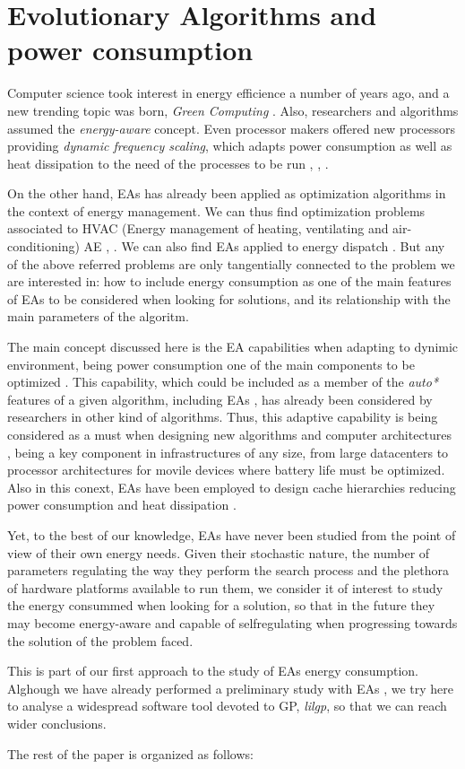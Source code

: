 \section{Evolutionary Algorithms and power consumption}

Computer science took interest in energy efficience a number of years ago, and a new trending topic was born, \textit{Green Computing} \cite{green-computing}.  Also, researchers and algorithms assumed the \textit{energy-aware} \cite{energy-aware} concept.  Even processor makers offered new processors providing \textit{dynamic frequency scaling}, which adapts power consumption as well as heat dissipation to the need of the processes to be run \cite{scaling}, \cite{dynamic-scaling}, \cite{energy-efficient}.

On the other hand, EAs has already been applied as optimization algorithms in the context of energy management.  We can thus find optimization problems associated to HVAC (Energy management of heating, ventilating and air-conditioning) AE \cite{HVAC}, \cite{chiller}.  We can also find EAs applied to energy dispatch \cite{dispatch}.  But any of the above referred problems are only tangentially connected to the problem we are interested in:  how to include energy consumption as one of the main features of EAs to be considered when looking for solutions, and its relationship with the main parameters of the algoritm.

The main concept discussed here is the EA capabilities when adapting to dynimic environment, being power consumption one of the main components to be optimized \cite{ephemeral}. This capability, which could be included as a member of the \textit{auto*} features of a given algorithm, including EAs \cite{self}, has already been considered by researchers in other kind of algorithms.  Thus, this adaptive capability is being considered as a must when designing new algorithms and computer architectures \cite{energy-aware}, being a key component in infrastructures of any size, from large datacenters to processor architectures for movile devices where battery life must be optimized.  Also in this conext, EAs have been employed to design cache hierarchies reducing power consumption and heat dissipation \cite{cache}.

Yet, to the best of our knowledge, EAs have never been studied from the point of view of their own energy needs.  Given their stochastic nature, the number of parameters regulating the way they perform the search process and the plethora of hardware platforms available to run them, we consider it of interest to study the energy consummed when looking for a solution, so that in the future they may become energy-aware and capable of selfregulating when progressing towards the solution of the problem faced.

This is part of our first approach to the study of EAs energy consumption.  Alghough we have already performed a preliminary study with EAs \cite{MAEB}, we try here to analyse a widespread software tool devoted to GP, \textit{lilgp}, so that we can reach wider conclusions.

The rest of the paper is organized as follows:  
